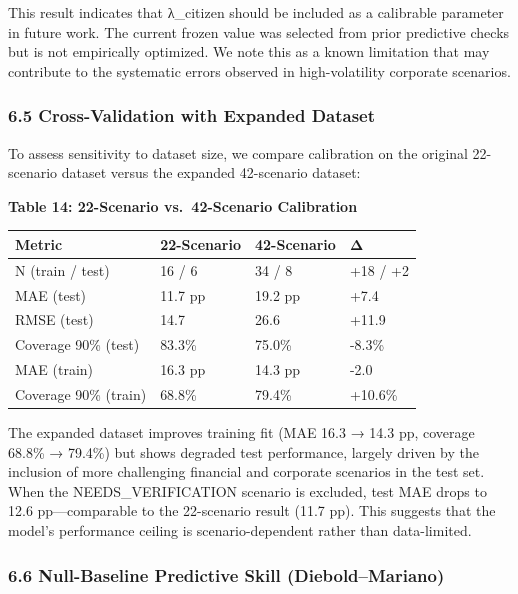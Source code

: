 \documentclass[
]{article}
\begin{document}
This result indicates that λ\_citizen should be included as a calibrable
parameter in future work. The current frozen value was selected from
prior predictive checks but is not empirically optimized. We note this
as a known limitation that may contribute to the systematic errors
observed in high-volatility corporate scenarios.

\subsubsection{6.5 Cross-Validation with Expanded
Dataset}\label{cross-validation-with-expanded-dataset}

To assess sensitivity to dataset size, we compare calibration on the
original 22-scenario dataset versus the expanded 42-scenario dataset:

\textbf{Table 14: 22-Scenario vs.~42-Scenario Calibration}

\begin{longtable}[]{@{}llll@{}}
\toprule\noalign{}
Metric & 22-Scenario & 42-Scenario & Δ \\
\midrule\noalign{}
\endhead
\bottomrule\noalign{}
\endlastfoot
N (train / test) & 16 / 6 & 34 / 8 & +18 / +2 \\
MAE (test) & 11.7 pp & 19.2 pp & +7.4 \\
RMSE (test) & 14.7 & 26.6 & +11.9 \\
Coverage 90\% (test) & 83.3\% & 75.0\% & -8.3\% \\
MAE (train) & 16.3 pp & 14.3 pp & -2.0 \\
Coverage 90\% (train) & 68.8\% & 79.4\% & +10.6\% \\
\end{longtable}

The expanded dataset improves training fit (MAE 16.3 → 14.3 pp, coverage
68.8\% → 79.4\%) but shows degraded test performance, largely driven by
the inclusion of more challenging financial and corporate scenarios in
the test set. When the NEEDS\_VERIFICATION scenario is excluded, test
MAE drops to 12.6 pp---comparable to the 22-scenario result (11.7 pp).
This suggests that the model's performance ceiling is scenario-dependent
rather than data-limited.

\subsubsection{6.6 Null-Baseline Predictive Skill
(Diebold--Mariano)}\label{null-baseline-predictive-skill-dieboldmariano}
\end{document}
